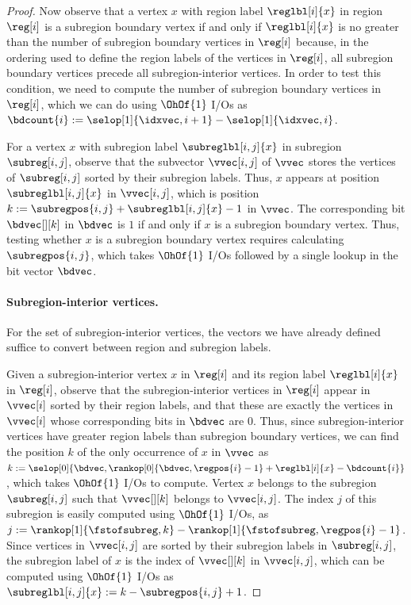 \begin{proof}
  Now observe that a vertex $x$ with region label $\reglbl[i]{x}$ in region
  $\reg[i]$ is a subregion boundary vertex if and only if
  $\reglbl[i]{x}$ is no greater than the number of subregion boundary vertices
  in $\reg[i]$ because, in the ordering used to define
  the region labels of the vertices in $\reg[i]$, all subregion boundary
  vertices precede all subregion-interior vertices.
  In order to test this condition, we need to compute the number of subregion
  boundary vertices in $\reg[i]$, which we can do using $\OhOf{1}$ I/Os
  as $\bdcount{i} := \selop[1]{\idxvec,i+1} - \selop[1]{\idxvec,i}$.
 
  For a vertex $x$ with subregion label $\subreglbl[i,j]{x}$ in subregion
  $\subreg[i,j]$, observe that the subvector $\vvec[i,j]$ of $\vvec$
  stores the vertices of $\subreg[i,j]$ sorted by their subregion labels.
  Thus, $x$ appears at position $\subreglbl[i,j]{x}$ in $\vvec[i,j]$,
  which is position $k := \subregpos{i,j} + \subreglbl[i,j]{x} - 1$ in $\vvec$.
  The corresponding bit $\bdvec[][k]$ in $\bdvec$ is $1$ if and only if
  $x$ is a subregion boundary vertex.
  Thus, testing whether $x$ is a subregion boundary vertex requires calculating
  $\subregpos{i,j}$, which takes $\OhOf{1}$ I/Os followed by a single lookup
  in the bit vector $\bdvec$.

  \paragraph{Subregion-interior vertices.}

  For the set of subregion-interior vertices, the vectors we have already
  defined suffice to convert between region
  and subregion labels.

  Given a subregion-interior vertex $x$ in $\reg[i]$ and its region label
  $\reglbl[i]{x}$ in $\reg[i]$, observe that the subregion-interior vertices in
  $\reg[i]$ appear in $\vvec[i]$ sorted by their region labels, and
  that these are exactly the vertices in $\vvec[i]$ whose corresponding
  bits in $\bdvec$ are $0$.
  Thus, since subregion-interior vertices have greater region labels than
  subregion boundary vertices, we can find the position $k$ of the only
  occurrence of $x$ in $\vvec$ as
  $k := \selop[0]{\bdvec, \rankop[0]{\bdvec, \regpos{i} - 1} + \reglbl[i]{x} 
  - \bdcount{i}}$, which takes $\OhOf{1}$ I/Os to compute.
  Vertex $x$ belongs to the subregion $\subreg[i,j]$ such that
  $\vvec[][k]$ belongs to $\vvec[i,j]$.
  The index $j$ of this subregion is easily computed using $\OhOf{1}$ I/Os, as
  $j := \rankop[1]{\fstofsubreg,k} - \rankop[1]{\fstofsubreg,\regpos{i}-1}$.
  Since vertices in $\vvec[i,j]$ are sorted by their subregion labels in
  $\subreg[i,j]$, the subregion label of $x$ is the index of $\vvec[][k]$
  in $\vvec[i,j]$, which can be computed using $\OhOf{1}$ I/Os as
  $\subreglbl[i,j]{x} := k - \subregpos{i,j} + 1$.


\end{proof}
